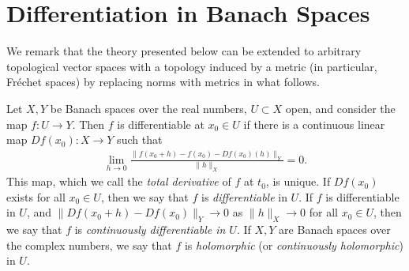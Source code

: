 %
\section{Differentiation in Banach Spaces}
We remark that the theory presented below can be extended to arbitrary
topological vector spaces with a topology induced by a metric (in particular,
Fr\'echet spaces) by replacing norms with metrics in what follows.
\begin{definition}
	\label{def:diff}
	Let $X,Y$ be Banach spaces over the real numbers, $U \subset X$ open,
  and consider the map $f: U \to Y$.
	Then $f$ is differentiable at $x_0 \in U$ if there
	is a continuous linear map $Df(x_0): X \to Y$ such that
	\begin{equation}
		\label{diff-limit}
		\begin{split}
			\lim_{h \to 0} \frac{\|f(x_0+ h) - f(x_0) -
			Df(x_0)(h) \|_Y}{\|h\|_{X}} = 0.
		\end{split}
	\end{equation}
	This map, which we call the \emph{total derivative} of $f$ at $t_0$, is 
	unique. If $Df(x_0)$ exists for all $x_0 \in U$,
	then we say that $f$ is
	\emph{differentiable} in $U$. If $f$ is differentiable in $U$, and 
	$\|Df(x_0 + h) - Df(x_0) \|_Y \to 0$ as $\|h\|_{X} \to 0$ for all $x_0 \in U$,
	then we say that $f$ is \emph{continuously differentiable in $U$}. If $X, Y$
  are Banach spaces over the complex numbers, we say that $f$ is
  \emph{holomorphic} (or \emph{continuously holomorphic}) in $U$.
\end{definition}
